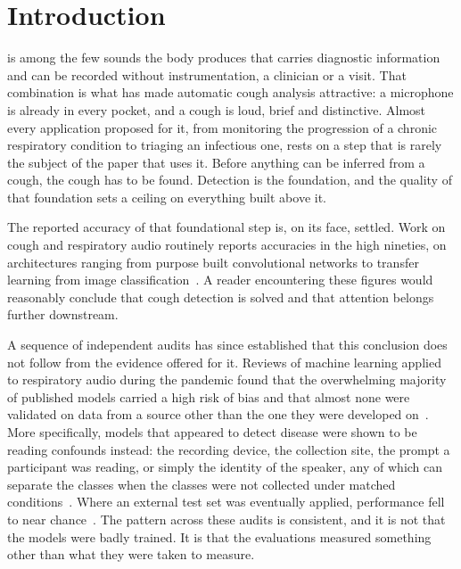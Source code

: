 \section{Introduction}\label{sec:intro}

 is among the few sounds the body produces that carries diagnostic information and
can be recorded without instrumentation, a clinician or a visit. That combination is what
has made automatic cough analysis attractive: a microphone is already in every pocket, and
a cough is loud, brief and distinctive. Almost every application proposed for it, from
monitoring the progression of a chronic respiratory condition to triaging an infectious
one, rests on a step that is rarely the subject of the paper that uses it. Before anything
can be inferred from a cough, the cough has to be found. Detection is the foundation, and
the quality of that foundation sets a ceiling on everything built above it.

The reported accuracy of that foundational step is, on its face, settled. Work on cough
and respiratory audio routinely reports accuracies in the high nineties, on architectures
ranging from purpose built convolutional networks to transfer learning from image
classification~\cite{imran2020, laguarta2020, pahar2021}. A reader encountering these
figures would reasonably conclude that cough detection is solved and that attention
belongs further downstream.

A sequence of independent audits has since established that this conclusion does not
follow from the evidence offered for it. Reviews of machine learning applied to
respiratory audio during the pandemic found that the overwhelming majority of published
models carried a high risk of bias and that almost none were validated on data from a
source other than the one they were developed on~\cite{roberts2021}. More specifically,
models that appeared to detect disease were shown to be reading confounds instead: the
recording device, the collection site, the prompt a participant was reading, or simply the
identity of the speaker, any of which can separate the classes when the classes were not
collected under matched conditions~\cite{han2022, coppock2024}. Where an external test set
was eventually applied, performance fell to near chance~\cite{xia2021, zhou2021}. The
pattern across these audits is consistent, and it is not that the models were badly
trained. It is that the evaluations measured something other than what they were taken to
measure.

